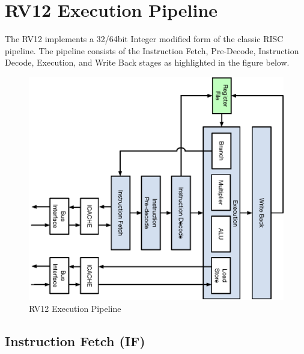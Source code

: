 \chapter{RV12 Execution Pipeline}

The RV12 implements a 32/64bit Integer modified form of the classic RISC pipeline.
The pipeline consists of the Instruction Fetch, Pre-Decode, Instruction Decode, Execution, and Write Back stages as highlighted in the figure below.


\begin{figure}[h]
  \includegraphics{assets/img/Pipeline-Overview}
  \caption{RV12 Execution Pipeline}
\end{figure}

\pagebreak

\section{Instruction Fetch (IF)}\label{instruction-fetch-if}

